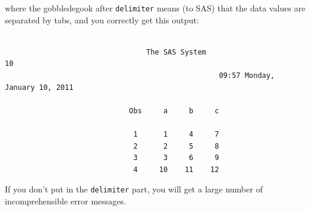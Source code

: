 \documentclass[11pt]{article}
\begin{document}
where the gobbledegook after \verb-delimiter- means (to SAS) that the
data values are separated by tabs, and you correctly get this output:

\filbreak
{\small
\begin{verbatim}

                                 The SAS System                               10
                                                  09:57 Monday, January 10, 2011

                             Obs     a     b     c

                              1      1     4     7
                              2      2     5     8
                              3      3     6     9
                              4     10    11    12
\end{verbatim}
}
\filbreak

If you don't put in the \verb-delimiter- part, you will get a large
number of incomprehensible error messages.
\end{document}

